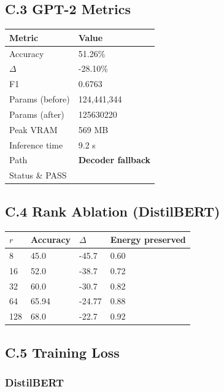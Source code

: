 \subsection{C.3 GPT-2 Metrics}

\begin{table}[H]
\centering
\small
\begin{tabular}{ll}
\toprule
\textbf{Metric} & \textbf{Value} \\
\midrule
Accuracy & 51.26\% \\
$\Delta$ & -28.10\% \\
F1 & 0.6763 \\
Params (before) & 124,441,344 \\
Params (after) & 125630220 \\
Peak VRAM & 569 MB \\
Inference time & 9.2 s \\
Path & \textbf{Decoder fallback} \\
Status \& PASS \\
\bottomrule
\end{tabular}
\end{table}

\subsection{C.4 Rank Ablation (DistilBERT)}

\begin{table}[H]
\centering
\small
\begin{tabular}{llll}
\toprule
\textbf{$r$} & \textbf{Accuracy} & \textbf{$\Delta$} & \textbf{Energy preserved} \\
\midrule
8 & 45.0 & -45.7 & 0.60 \\
16 & 52.0 & -38.7 & 0.72 \\
32 & 60.0 & -30.7 & 0.82 \\
64 & 65.94 & -24.77 & 0.88 \\
128 & 68.0 & -22.7 & 0.92 \\
\bottomrule
\end{tabular}
\end{table}

\subsection{C.5 Training Loss}

\subsubsection{DistilBERT}

